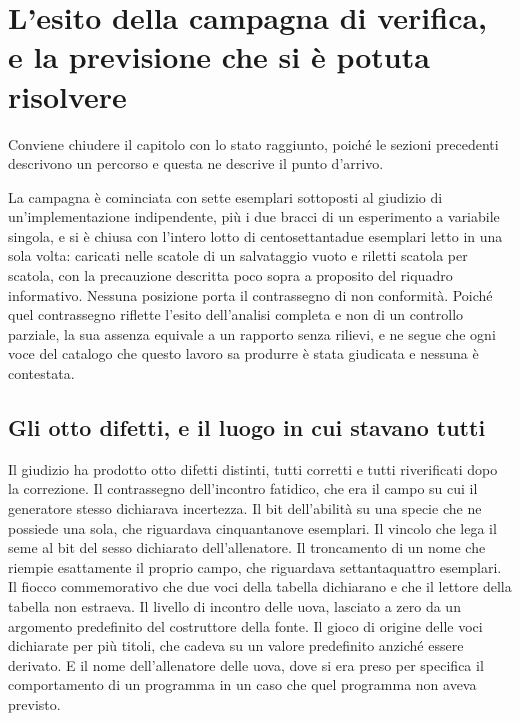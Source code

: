 \section{L'esito della campagna di verifica, e la previsione che si è potuta risolvere}

Conviene chiudere il capitolo con lo stato raggiunto, poiché le sezioni precedenti descrivono un percorso e questa ne descrive il punto d'arrivo.

La campagna è cominciata con sette esemplari sottoposti al giudizio di un'implementazione indipendente, più i due bracci di un esperimento a variabile singola, e si è chiusa con l'intero lotto di centosettantadue esemplari letto in una sola volta: caricati nelle scatole di un salvataggio vuoto e riletti scatola per scatola, con la precauzione descritta poco sopra a proposito del riquadro informativo. Nessuna posizione porta il contrassegno di non conformità. Poiché quel contrassegno riflette l'esito dell'analisi completa e non di un controllo parziale, la sua assenza equivale a un rapporto senza rilievi, e ne segue che ogni voce del catalogo che questo lavoro sa produrre è stata giudicata e nessuna è contestata.

\subsection*{Gli otto difetti, e il luogo in cui stavano tutti}

Il giudizio ha prodotto otto difetti distinti, tutti corretti e tutti riverificati dopo la correzione. Il contrassegno dell'incontro fatidico, che era il campo su cui il generatore stesso dichiarava incertezza. Il bit dell'abilità su una specie che ne possiede una sola, che riguardava cinquantanove esemplari. Il vincolo che lega il seme al bit del sesso dichiarato dell'allenatore. Il troncamento di un nome che riempie esattamente il proprio campo, che riguardava settantaquattro esemplari. Il fiocco commemorativo che due voci della tabella dichiarano e che il lettore della tabella non estraeva. Il livello di incontro delle uova, lasciato a zero da un argomento predefinito del costruttore della fonte. Il gioco di origine delle voci dichiarate per più titoli, che cadeva su un valore predefinito anziché essere derivato. E il nome dell'allenatore delle uova, dove si era preso per specifica il comportamento di un programma in un caso che quel programma non aveva previsto.

